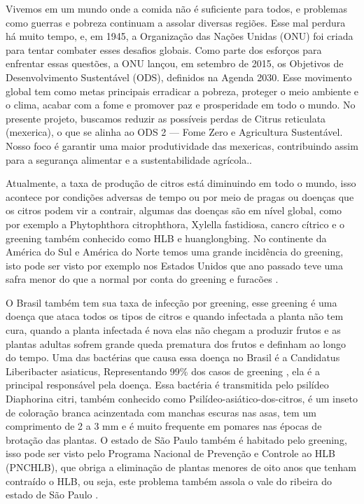 Vivemos em um mundo onde a comida não é suficiente para todos, e problemas como guerras e pobreza continuam a assolar diversas regiões. Esse mal perdura há muito tempo, e, em 1945, a Organização das Nações Unidas (ONU) foi criada para tentar combater esses desafios globais. Como parte dos esforços para enfrentar essas questões, a ONU lançou, em setembro de 2015, os Objetivos de Desenvolvimento Sustentável (ODS), definidos na Agenda 2030. Esse movimento global tem como metas principais erradicar a pobreza, proteger o meio ambiente e o clima, acabar com a fome e promover paz e prosperidade em todo o mundo. No presente projeto, buscamos reduzir as possíveis perdas de Citrus reticulata (mexerica), o que se alinha ao ODS 2 — Fome Zero e Agricultura Sustentável. Nosso foco é garantir uma maior produtividade das mexericas, contribuindo assim para a segurança alimentar e a sustentabilidade agrícola.\cite{IntroduçãoGreening}.

Atualmente, a taxa de produção de citros está diminuindo em todo o mundo, isso acontece por condições adversas de tempo ou por meio de pragas ou doenças que os citros podem vir a contrair, algumas das doenças são em nível global, como por exemplo a Phytophthora citrophthora, Xylella fastidiosa, cancro cítrico e o greening também conhecido como HLB e huanglongbing. No continente da América do Sul e América do Norte temos uma grande incidência do greening, isto pode ser visto por exemplo nos Estados Unidos que ano passado teve uma safra menor do que a normal por conta do greening e furacões \cite{IntroduçãoEUAProblemas}.

O Brasil também tem sua taxa de infecção por greening, esse greening é uma doença que ataca todos os tipos de citros e quando infectada a planta não tem cura, quando a planta infectada é nova elas não chegam a produzir frutos e as plantas adultas sofrem grande queda prematura dos frutos e definham ao longo do tempo. Uma das bactérias que causa essa doença no Brasil é a Candidatus Liberibacter asiaticus, Representando 99\% dos casos de greening , ela é a principal responsável pela doença. Essa bactéria é transmitida pelo psilídeo Diaphorina citri, também conhecido como Psilídeo-asiático-dos-citros, é um inseto de coloração branca acinzentada com manchas escuras nas asas, tem um comprimento de 2 a 3 mm e é muito frequente em pomares nas épocas de brotação das plantas. O estado de São Paulo também é habitado pelo greening, isso pode ser visto pelo Programa Nacional de Prevenção e Controle ao HLB (PNCHLB), que obriga a eliminação de plantas menores de oito anos que tenham contraído o HLB, ou seja, este problema também assola o vale do ribeira do estado de São Paulo \cite{IntroduçãoGreening}.

